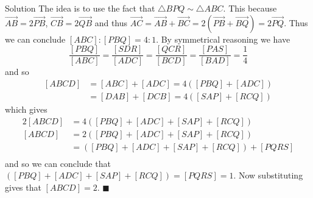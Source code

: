\documentclass{article}
\begin{document}
\begin{solution}{Solution}
The idea is to use the fact that $\triangle BPQ \sim \triangle ABC$.
This because $\overrightarrow{AB} = 2\overrightarrow{PB}$,
$\overrightarrow{CB} = 2\overrightarrow{QB}$ and thus
$\overrightarrow{AC} = \overrightarrow{AB} + \overrightarrow{BC} =
2(\overrightarrow{PB} + \overrightarrow{BQ}) = 2\overrightarrow{PQ}$. Thus we can conclude
$[ABC] : [PBQ] = 4 : 1$. By symmetrical reasoning we have
$$
\frac{[PBQ]}{[ABC]} = \frac{[SDR]}{[ADC]} = \frac{[QCR]}{[BCD]} =
\frac{[PAS]}{[BAD]} = \frac{1}{4}
$$
and so
\[
\begin{aligned}
[ABCD] &= [ABC] + [ADC] = 4([PBQ] + [ADC])\\
&= [DAB] + [DCB] = 4([SAP] + [RCQ])
\end{aligned}
\]
which gives
\[
\begin{aligned}
2[ABCD] &= 4([PBQ] + [ADC] + [SAP] + [RCQ])\\
[ABCD] &= 2([PBQ] + [ADC] + [SAP] + [RCQ])\\
&=  ([PBQ] + [ADC] + [SAP] + [RCQ]) + [PQRS]\\
\end{aligned}
\]
and so we can conclude that $([PBQ] + [ADC] + [SAP] + [RCQ]) = [PQRS] = 1$.
Now substituting gives that $[ABCD] = 2$. $\blacksquare$
\end{solution}
\end{document}

